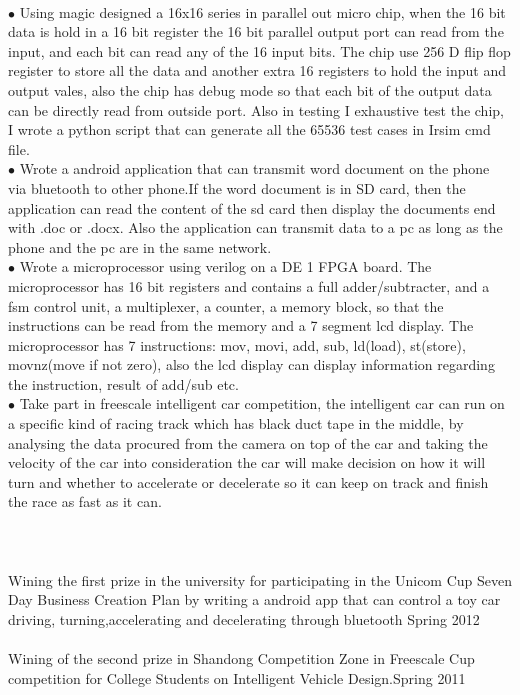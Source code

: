 \documentclass[11pt]{article} %
\begin{document}
\\
$\bullet$ Using magic designed a 16x16 series in parallel out micro chip, when the 16 bit data is hold in a 16 bit register the 16 bit parallel output port can read from the input, and each bit can read any of the 16 input bits. The chip use 256 D flip flop register to store all the data and another extra 16 registers to hold the input and output vales, also the chip has debug mode so that each bit of the output data can be directly read from outside port. Also in testing I exhaustive test the chip, I wrote a python script that can generate all the 65536 test cases in Irsim cmd file. 
\\
$\bullet$ Wrote a android application that can transmit word document on the phone via bluetooth to other phone.If the word document is in SD card, then the application can read the content of the sd card then display the documents end with .doc or .docx. Also the application can transmit data to a pc as long as the phone and the pc are in the same network. 
\\
$\bullet$ Wrote a microprocessor using verilog on a DE 1 FPGA board. The microprocessor has 16 bit registers and contains a full adder/subtracter, and a fsm control unit, a multiplexer, a counter, a memory block, so that the instructions can be read from the memory and a 7 segment lcd display. The microprocessor has 7 instructions: mov, movi, add, sub, ld(load), st(store), movnz(move if not zero), also the lcd display can display information regarding the instruction, result of add/sub etc.
\\
$\bullet$ Take part in freescale intelligent car competition, the intelligent car can run on a specific kind of racing track which has black duct tape in the middle, by analysing the data procured from the camera on top of the car and taking the velocity of the car into consideration the car will make decision on how it will turn and whether to accelerate or decelerate so it can keep on track and finish the race as fast as it can.
\\
\\
\\
\\
Wining the first prize in the university for participating in the Unicom Cup
Seven Day Business Creation Plan by writing a android app that can control a toy car driving, turning,accelerating and decelerating through bluetooth \hfill Spring 2012
\\
\\
Wining of the second prize in Shandong Competition Zone in Freescale Cup competition for College Students on Intelligent Vehicle Design.\hfill Spring 2011
\end{document}
